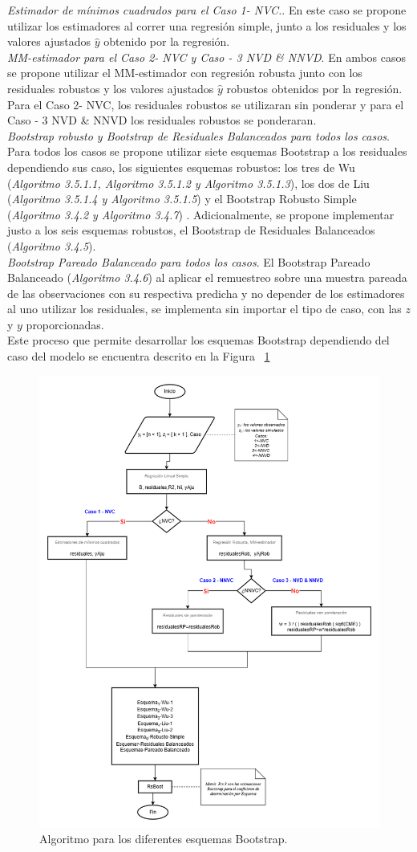 \textit{Estimador de mínimos cuadrados para el Caso 1- NVC.}. En este caso se propone utilizar los estimadores al correr una regresión simple, junto a los residuales y los valores ajustados $\hat{y}$ obtenido por la regresión.\\


\textit{MM-estimador para el Caso 2- NVC y  Caso - 3 NVD \& NNVD}. En ambos casos se propone utilizar el MM-estimador con regresión robusta junto con los residuales robustos y los valores ajustados $\hat{y}$ robustos obtenidos por la regresión. Para el Caso 2- NVC, los residuales robustos se utilizaran sin ponderar y para el  Caso - 3 NVD \& NNVD los residuales robustos se ponderaran.  \\



\textit{Bootstrap robusto y Bootstrap de Residuales Balanceados para todos los casos}. Para todos los casos se propone utilizar siete esquemas Bootstrap a los residuales dependiendo sus caso, los siguientes esquemas robustos: los tres de Wu (\textit{Algoritmo 3.5.1.1, Algoritmo 3.5.1.2 y Algoritmo 3.5.1.3}), los dos de Liu (\textit{Algoritmo 3.5.1.4 y Algoritmo 3.5.1.5}) y el Bootstrap Robusto Simple (\textit{Algoritmo 3.4.2 y Algoritmo 3.4.7}) . Adicionalmente, se propone implementar justo a los seis esquemas robustos, el Bootstrap de Residuales Balanceados (\textit{Algoritmo 3.4.5}). \\


\textit{Bootstrap Pareado Balanceado para todos los casos}. El Bootstrap Pareado Balanceado (\textit{Algoritmo 3.4.6}) al aplicar el remuestreo sobre una muestra pareada de las observaciones con su respectiva predicha y no depender de los estimadores al uno utilizar los residuales, se implementa sin importar el tipo de caso, con las $z$ y $y$ proporcionadas.\\

Este proceso que permite desarrollar los esquemas Bootstrap dependiendo del caso del modelo se encuentra descrito en la Figura ~\ref{fig:AlgDifEsqBoots}

 

\begin{figure}[ht!]
	\centering 
	\includegraphics[width=0.4\linewidth]{img/metodologia_v6.png} 
	\caption{Algoritmo para los diferentes esquemas Bootstrap.}
	\label{fig:AlgDifEsqBoots}
\end{figure}
\FloatBarrier

